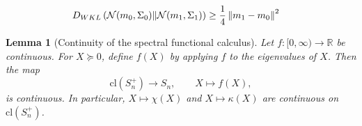 \documentclass[10pt,a4paper]{amsart}
\newtheorem{lemma}{Lemma}
\begin{document}
\begin{align}\label{eq:uniform_lower_bound}  
    D_{\rm WKL}\left(\mathcal{N}(m_0,\Sigma_0) \| \mathcal{N}(m_1,\Sigma_1)\right) &\geq  \frac{1}{4}\left\lVert m_1-m_0 \right\rVert^2
\end{align}

\begin{lemma}[Continuity of the spectral functional calculus]\label{lemm:continuous_spectral_calculus}
Let $f:[0,\infty)\to\mathbb R$ be continuous. For $X\succeq0$, define $f(X)$ by applying $f$ to the eigenvalues of $X$. Then the map
\[
\mathrm{cl}(S_n^+)\longrightarrow S_n,
\qquad X\longmapsto f(X),
\]
is continuous. In particular, $X\mapsto\chi(X)$ and $X\mapsto\kappa(X)$ are continuous on $\mathrm{cl}(S_n^+)$.
\end{lemma}
\end{document}
